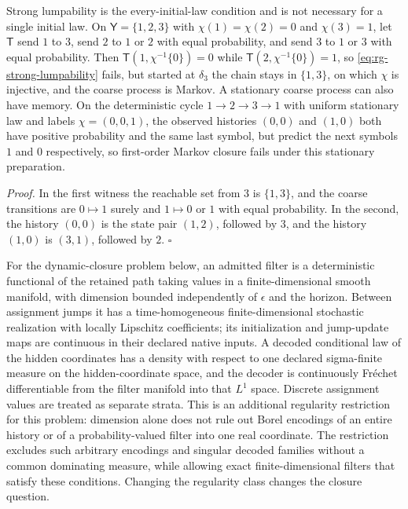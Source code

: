 Strong lumpability is the every-initial-law condition and is not necessary for a
single initial law. On $\mathsf Y=\{1,2,3\}$ with $\chi(1)=\chi(2)=0$ and $\chi(3)=1$,
let $\mathsf T$ send $1$ to $3$, send $2$ to $1$ or $2$ with equal probability, and
send $3$ to $1$ or $3$ with equal probability. Then $\mathsf T(1,\chi^{-1}\{0\})=0$
while $\mathsf T(2,\chi^{-1}\{0\})=1$, so \eqref{eq:rg-strong-lumpability} fails, but
started at $\delta_3$ the chain stays in $\{1,3\}$, on which $\chi$ is injective, and
the coarse process is Markov. A stationary coarse process can also have memory. On
the deterministic cycle $1\to2\to3\to1$ with uniform stationary law and labels
$\chi=(0,0,1)$, the observed histories $(0,0)$ and $(1,0)$ both have positive
probability and the same last symbol, but predict the next symbols $1$ and $0$
respectively, so first-order Markov closure fails under this stationary preparation.

\noindent\emph{Proof.}
In the first witness the reachable set from $3$ is $\{1,3\}$, and the coarse
transitions are $0\mapsto1$ surely and $1\mapsto0$ or $1$ with equal probability. In
the second, the history $(0,0)$ is the state pair $(1,2)$, followed by $3$, and the
history $(1,0)$ is $(3,1)$, followed by $2$. $\square$

For the dynamic-closure problem below, an admitted filter is a deterministic functional of the
retained path taking values in a finite-dimensional smooth manifold, with dimension bounded
independently of $\epsilon$ and the horizon. Between assignment jumps it has a time-homogeneous
finite-dimensional stochastic realization with locally Lipschitz coefficients; its initialization
and jump-update maps are continuous in their declared native inputs. A decoded conditional law of
the hidden coordinates has a density with respect to one declared sigma-finite measure on the
hidden-coordinate space, and the decoder is continuously Fr\'echet differentiable from the filter
manifold into that $L^1$ space. Discrete assignment values are treated as separate strata.
This is an additional regularity restriction for this problem: dimension alone does not rule out
Borel encodings of an entire history or of a probability-valued filter into one real coordinate.
The restriction excludes such arbitrary encodings and singular decoded families without a common
dominating measure, while allowing exact finite-dimensional filters that satisfy these conditions.
Changing the regularity class changes the closure question.

